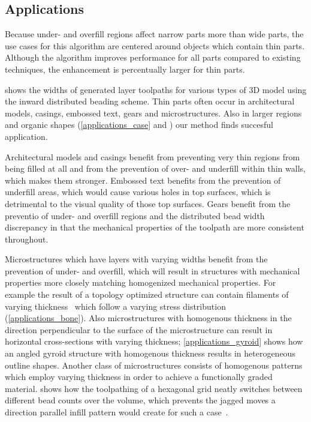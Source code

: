 \subsection{Applications}
Because under- and overfill regions affect narrow parts more than wide parts, the use cases for this algorithm are centered around objects which contain thin parts.
Although the algorithm improves performance for all parts compared to existing techniques, the enhancement is percentually larger for thin parts.


 shows the widths of generated layer toolpaths for various types of 3D model using the inward distributed beading scheme.
Thin parts often occur in architectural models, casings, embossed text, gears and microstructures.
Also in larger regions and organic shapes (\cref{applications_case} and ) our method finds succesful application.

Architectural models and casings benefit from preventing very thin regions from being filled at all and from the prevention of over- and underfill within thin walls, which makes them stronger.
Embossed text benefits from the prevention of underfill areas, which would cause various holes in top surfaces, which is detrimental to the visual quality of those top surfaces.
Gears benefit from the preventio of under- and overfill regions and the distributed bead width discrepancy in that the mechanical properties of the toolpath are more consistent throughout.

Microstructures which have layers with varying widths benefit from the prevention of under- and overfill, which will result in structures with mechanical properties more closely matching homogenized mechanical properties.
For example the result of a topology optimized structure can contain filaments of varying thickness~\cite{wu2017infill} which follow a varying stress distribution (\cref{applications_bone}).
Also microstructures with homogenous thickness in the direction perpendicular to the surface of the microstructure can result in horizontal cross-sections with varying thickness;
\cref{applications_gyroid} shows how an angled gyroid structure with homogenous thickness results in heterogeneous outline shapes.
Another class of microstructures consists of homogenous patterns which employ varying thickness in order to achieve a functionally graded material.
 shows how the toolpathing of a hexagonal grid neatly switches between different bead counts over the volume, which prevents the jagged moves a direction parallel infill pattern would create for such a case~\cite{bates2018compressive}.



